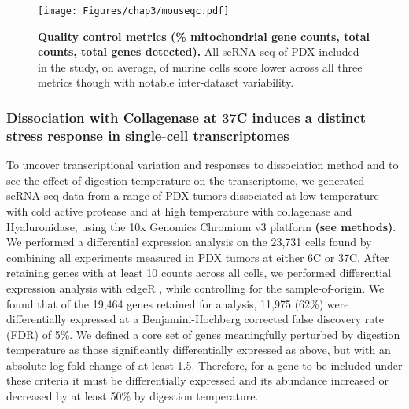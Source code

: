 
\begin{figure}
\centering
\texttt{[image: Figures/chap3/mouseqc.pdf]}
	
\caption[Quality control metrics (\% mitochondrial gene counts, total counts, total genes detected)]
	{\small
	\textbf{Quality control metrics (\% mitochondrial gene counts, total counts, total genes detected).}
	   All scRNA-seq of PDX included in the study, on average, of murine cells score lower across all three metrics though with notable inter-dataset variability.
	}
	\label{fig:mouseqc}
\end{figure}



\subsubsection{Dissociation with Collagenase at 37\textdegree C induces a distinct stress response in single-cell transcriptomes}
To uncover transcriptional variation and responses to dissociation method and to see the effect of digestion temperature on the transcriptome, we generated scRNA-seq data from a range of PDX tumors dissociated at low temperature with cold active protease and at high temperature with collagenase and Hyaluronidase, using the 10x Genomics Chromium v3 platform \textbf{(see methods)}.
We performed a differential expression analysis on the 23,731 cells found by combining all experiments measured in PDX tumors at either 6\textdegree C or 37\textdegree C. After retaining genes with at least 10 counts across all cells, we performed differential expression analysis with edgeR \cite{robinson2010edger}, while controlling for the sample-of-origin.
We found that of the 19,464 genes retained for analysis, 11,975 (62\%) were differentially expressed at a Benjamini-Hochberg corrected false discovery rate (FDR) of 5\%. We defined a core set of genes meaningfully perturbed by digestion temperature as those significantly differentially expressed as above, but with an absolute log fold change of at least 1.5. Therefore, for a gene to be included under these criteria it must be differentially expressed and its abundance increased or decreased by at least 50\% by digestion temperature. 


